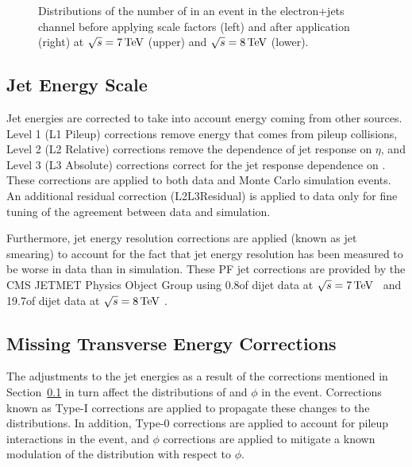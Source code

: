 \begin{figure}[hbtp]
     \caption[Distributions of the number of \btags in an event in the electron+jets channel before
     and after applying \btag scale factors at $\roots=7\TeV$ and $\roots=8\TeV$.]{Distributions of
     the number of \btags in an event in the electron+jets channel before applying \btag scale factors (left)
     and after application (right) at $\roots=7\TeV$ (upper) and $\roots=8\TeV$ (lower).}
     \label{fig:nbjets_before_and_after_btag_scale_factors_electrons}
\end{figure}


\subsection{Jet Energy Scale}
\label{sss:jet_energy_scale}
Jet energies are corrected to take into account energy coming from other sources. Level 1 (L1 Pileup)
corrections remove energy that comes from pileup collisions, Level 2 (L2 Relative) corrections remove the
dependence of jet response on $\eta$, and Level 3 (L3 Absolute) corrections correct for the jet response
dependence on \pt \cite{Chatrchyan:2011ds}. These corrections are applied to both data and Monte Carlo
simulation events. An additional residual correction (L2L3Residual) is applied to data only for fine tuning of the agreement between data and
simulation.

Furthermore, jet energy resolution corrections are applied (known as jet smearing) to account for the fact
that jet energy resolution has been measured to be worse in data than in simulation. These PF jet corrections
are provided by the CMS JETMET Physics Object Group using 0.8\fbinv of dijet data at
$\roots=7\TeV$~\cite{Chatrchyan:2011ds} and 19.7\fbinv of dijet data at $\roots=8\TeV$ \cite{jet_res_2012}.

\subsection{Missing Transverse Energy Corrections}
\label{ss:met_corrections}
The adjustments to the jet energies as a result of the corrections mentioned in
Section~\ref{sss:jet_energy_scale} in turn affect the distributions of \met and \met $\phi$ in the event.
Corrections known as Type-I \met corrections are applied to propagate these changes to the \met distributions.
In addition, Type-0 corrections are applied to account for pileup interactions in the event, and \met $\phi$
corrections are applied to mitigate a known modulation of the \met distribution with respect to $\phi$.
 
